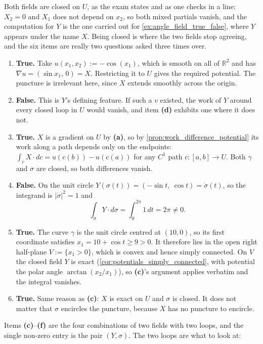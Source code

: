 \begin{exercisesolution}
\label{sol:two_fields_two_circles}
Both fields are closed on $U$, as the exam states and as one checks in a line: $X_2 = 0$ and $X_1$
does not depend on $x_2$, so both mixed partials vanish, and the computation for $Y$ is the one
carried out for \cref{ex:angle_field_true_false}, where $Y$ appears under the name $X$. Being
closed is where the two fields stop agreeing, and the six items are really two questions asked
three times over.
\begin{enumerate}[label=\textbf{(\alph*)}]
  \item \textbf{True.} Take $u(x_1,x_2) := -\cos(x_1)$, which is smooth on all of $\mathbb{R}^2$
    and has $\nabla u = (\sin x_1,\, 0) = X$. Restricting it to $U$ gives the required potential.
    The puncture is irrelevant here, since $X$ extends smoothly across the origin.
  \item \textbf{False.} This is $Y$'s defining feature. If such a $v$ existed, the work of $Y$
    around every closed loop in $U$ would vanish, and item \textbf{(d)} exhibits one where it does
    not.
  \item \textbf{True.} $X$ is a gradient on $U$ by \textbf{(a)}, so by
    \cref{prop:work_difference_potential} its work along a path depends only on the endpoints:
    $\int_c X\cdot dc = u(c(b)) - u(c(a))$ for any $C^1$ path $c : [a,b] \to U$. Both $\gamma$ and
    $\sigma$ are closed, so both differences vanish.
  \item \textbf{False.} On the unit circle $Y(\sigma(t)) = (-\sin t,\ \cos t) = \dot\sigma(t)$,
    so the integrand is $\lvert\dot\sigma\rvert^2 = 1$ and
    \[\int_\sigma Y\cdot d\sigma = \int_0^{2\pi} 1\,dt = 2\pi \neq 0 .\]
  \item \textbf{True.} The curve $\gamma$ is the unit circle centred at $(10,0)$, so its first
    coordinate satisfies $x_1 = 10+\cos t \geq 9 > 0$. It therefore lies in the open right
    half-plane $V := \{x_1 > 0\}$, which is convex and hence simply connected. On $V$ the closed
    field $Y$ is exact (\cref{cor:potentials_simply_connected}, with potential the polar angle
    $\arctan(x_2/x_1)$), so \textbf{(c)}'s argument applies verbatim and the integral vanishes.
  \item \textbf{True.} Same reason as \textbf{(c)}: $X$ is exact on $U$ and $\sigma$ is closed. It
    does not matter that $\sigma$ encircles the puncture, because $X$ has no puncture to encircle.
\end{enumerate}
\begin{remark}
Items \textbf{(c)}--\textbf{(f)} are the four combinations of two fields with two loops, and the
single non-zero entry is the pair $(Y,\sigma)$. The two loops are what to look at:


\end{remark}
\end{exercisesolution}
